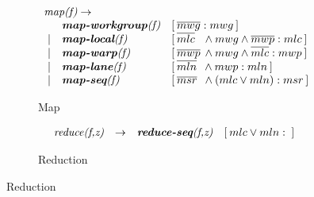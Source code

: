 \begin{figure}[t]
\centering

\begin{subfigure}[b]{1\linewidth}
\begin{mdframed}
$$
\begin{array}{lll}
\multicolumn{3}{l}{\pat{map(f)} \rightarrow} \\
       & \pat{\textbf{map-workgroup}(f)} & [\hspace{.2em}\overline{mwg}:mwg\hspace{.2em}]\\
{\ } | & \pat{\textbf{map-local}(f)    } & [\hspace{.2em}\overline{mlc}\hspace{.7em} \wedge mwg\wedge\overline{mwp}:mlc\hspace{.2em}]\\
{\ } | & \pat{\textbf{map-warp}(f)     } & [\hspace{.2em}\overline{mwp}\hspace{.2em} \wedge mwg\wedge\overline{mlc}:mwp\hspace{.2em}]\\
{\ } | & \pat{\textbf{map-lane}(f)     } & [\hspace{.2em}\overline{mln}\hspace{.5em} \wedge mwp:mln\hspace{.2em}]\\
{\ } | & \pat{\textbf{map-seq}(f)   } & [\hspace{.2em}\overline{msr}\hspace{.5em} \wedge (mlc\vee mln):msr\hspace{.2em}]\\          
\end{array}
$$
\end{mdframed}
  \caption{Map}
  \label{fig:low:map}
\end{subfigure}

\vspace{-0.5em}
\begin{subfigure}[b]{1\linewidth}
\begin{mdframed}
$$
\begin{array}{llll}
  \pat{reduce(f,z)} & \rightarrow & \pat{\textbf{reduce-seq}(f,z)} & [\hspace{.2em}mlc\vee mln:\ \hspace{.2em}]\\   
\end{array}
$$
\end{mdframed}
  \caption{Reduction}
  \label{fig:low:red}
\end{subfigure}


\end{figure}
